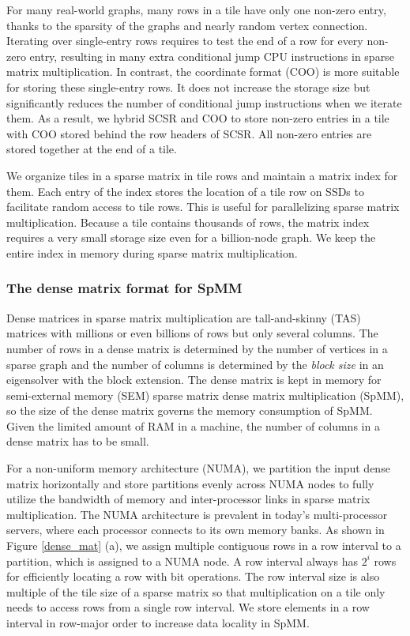 For many real-world graphs, many rows in a tile have only one non-zero entry,
thanks to the sparsity of the graphs and nearly random vertex connection.
Iterating over single-entry rows requires to test the end of a row for every
non-zero entry, resulting in many extra conditional jump CPU instructions
in sparse matrix multiplication.
In contrast, the coordinate format (COO) is more suitable for storing these
single-entry rows. It does not increase the storage size but significantly
reduces the number of conditional jump instructions when we iterate
them. As a result, we hybrid SCSR and COO to store non-zero entries in a tile
with COO stored behind the row headers of SCSR. All non-zero entries are
stored together at the end of a tile.

We organize tiles in a sparse matrix in tile rows and maintain a matrix index
for them. Each entry of the index stores the location of a tile row on SSDs
to facilitate random access
to tile rows. This is useful for parallelizing sparse matrix multiplication.
Because a tile contains thousands of rows, the matrix index requires a very
small storage size even for a billion-node graph. We keep the entire index
in memory during sparse matrix multiplication.

\subsubsection{The dense matrix format for SpMM} \label{numa_mat}
Dense matrices in sparse matrix multiplication are tall-and-skinny (TAS)
matrices
with millions or even billions of rows but only several columns. The number
of rows in a dense matrix is determined by the number of vertices in a sparse
graph and the number of columns is determined by the \textit{block size}
in an eigensolver with the block extension. The dense matrix is kept in memory
for semi-external memory (SEM) sparse matrix dense matrix multiplication (SpMM),
so the size of the dense matrix governs the memory consumption
of SpMM. Given the limited amount of RAM in a machine, the number of columns
in a dense matrix has to be small.

For a non-uniform memory architecture (NUMA), we partition the input dense matrix
horizontally and store partitions evenly across NUMA nodes to fully utilize
the bandwidth of memory and inter-processor links in sparse matrix
multiplication. The NUMA architecture is prevalent in today's multi-processor
servers, where each processor connects to its own memory banks. As shown in
Figure \ref{dense_mat} (a), we assign multiple
contiguous rows in a row interval to a partition, which is assigned to a NUMA
node. A row interval always has $2^i$ rows for efficiently locating a row
with bit operations. The row interval size is also multiple of the tile size of
a sparse matrix so that multiplication on a tile only needs to access rows
from a single row interval. We store elements in a row interval in row-major
order to increase data locality in SpMM.

